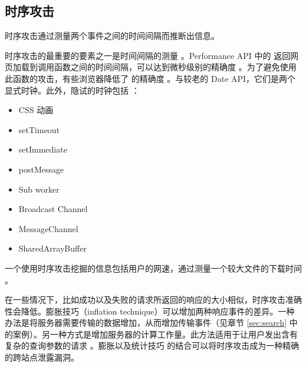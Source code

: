 \subsection{时序攻击}

时序攻击通过测量两个事件之间的时间间隔而推断出信息。

时序攻击的最重要的要素之一是时间间隔的测量 \cite{clock}。Performance API 中的  返回网页加载到调用函数之间的时间间隔，可以达到微秒级别的精确度 \cite{m_now}。为了避免使用此函数的攻击，有些浏览器降低了 的精确度 \cite{p_chr,p_moz,p_web}。与较老的 Date API，它们是两个显式时钟。此外，隐试的时钟包括 \cite{timers}：

\begin{multicols}{2}
    \begin{itemize}
        \item CSS 动画
        \item setTimeout
        \item setImmediate
        \item postMessage
        \item Sub worker
        \item Broadcast Channel
        \item MessageChannel
        \item SharedArrayBuffer
    \end{itemize}
\end{multicols}

一个使用时序攻击挖掘的信息包括用户的网速，通过测量一个较大文件的下载时间 \cite{speed}。

在一些情况下，比如成功以及失败的请求所返回的响应的大小相似，时序攻击准确性会降低。膨胀技巧（inflation technique）可以增加两种响应事件的差异。一种办法是将服务器需要传输的数据增加，从而增加传输事件（见章节 \ref{sec:search} 中的案例）。另一种方式是增加服务器的计算工作量。此方法适用于让用户发出含有复杂的查询参数的请求 \cite{inflation}。膨胀以及统计技巧 \cite{stats} 的结合可以将时序攻击成为一种精确的跨站点泄露漏洞。